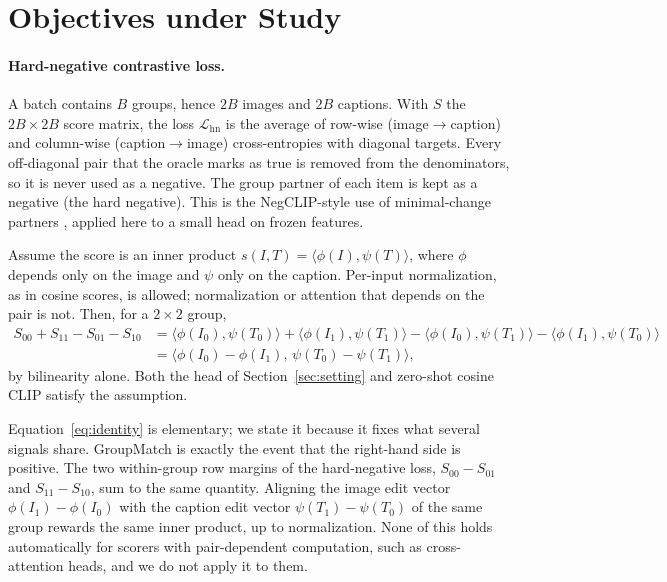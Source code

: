 \section{Objectives under Study}
\label{sec:method}

\paragraph{Hard-negative contrastive loss.}
A batch contains $B$ groups, hence $2B$ images and $2B$ captions. With $S$ the $2B{\times}2B$
score matrix, the loss $\mathcal{L}_{\mathrm{hn}}$ is the average of row-wise (image$\to$caption)
and column-wise (caption$\to$image) cross-entropies with diagonal targets. Every off-diagonal pair
that the oracle marks as true is removed from the denominators, so it is never used as a negative.
The group partner of each item is kept as a negative (the hard negative). This is the NegCLIP-style
use of minimal-change partners \citep{yuksekgonul2023bow,awal2024vismin}, applied here to a small
head on frozen features.

\begin{remark}
\label{rem:identity}
Assume the score is an inner product $s(I,T)=\langle \phi(I),\psi(T)\rangle$, where $\phi$ depends
only on the image and $\psi$ only on the caption. Per-input normalization, as in cosine scores, is
allowed; normalization or attention that depends on the pair is not. Then, for a $2{\times}2$
group,
\begin{equation}
\begin{aligned}
S_{00}+S_{11}-S_{01}-S_{10}
&=\langle\phi(I_0),\psi(T_0)\rangle+\langle\phi(I_1),\psi(T_1)\rangle
-\langle\phi(I_0),\psi(T_1)\rangle-\langle\phi(I_1),\psi(T_0)\rangle\\
&=\langle \phi(I_0)-\phi(I_1),\,\psi(T_0)-\psi(T_1)\rangle ,
\end{aligned}
\label{eq:identity}
\end{equation}
by bilinearity alone. Both the head of Section~\ref{sec:setting} and zero-shot cosine CLIP satisfy
the assumption.
\end{remark}

Equation~\eqref{eq:identity} is elementary; we state it because it fixes what several signals
share. GroupMatch is exactly the event that the right-hand side is positive. The two within-group
row margins of the hard-negative loss, $S_{00}-S_{01}$ and $S_{11}-S_{10}$, sum to the same
quantity. Aligning the image edit vector $\phi(I_1)-\phi(I_0)$ with the caption edit vector
$\psi(T_1)-\psi(T_0)$ of the same group rewards the same inner product, up to normalization. None
of this holds automatically for scorers with pair-dependent computation, such as cross-attention
heads, and we do not apply it to them.

